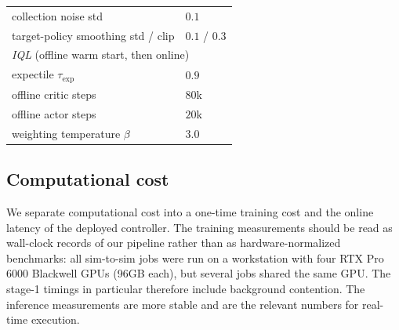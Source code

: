 \documentclass{article} %
\begin{document}
\begin{table}[h]
\begin{tabular}{ll}
collection noise std              & $0.1$ \\
target-policy smoothing std / clip & $0.1$ / $0.3$ \\
\midrule
\multicolumn{2}{l}{\emph{IQL} (offline warm start, then online)} \\
\midrule
expectile $\tau_{\text{exp}}$     & $0.9$ \\
offline critic steps              & $80$k \\
offline actor steps               & $20$k \\
weighting temperature $\beta$ & $3.0$ \\
\bottomrule
\end{tabular}
\end{table}

\subsection{Computational cost}
\label{app:compute}

We separate computational cost into a one-time training cost and the online
latency of the deployed controller. The training measurements should be read as
wall-clock records of our pipeline rather than as hardware-normalized
benchmarks: all sim-to-sim jobs were run on a workstation with four RTX Pro 6000
Blackwell GPUs (96GB each), but several jobs shared the same GPU. The stage-1
timings in particular therefore include background contention. The inference
measurements are more stable and are the relevant numbers for real-time
execution.
\end{document}
